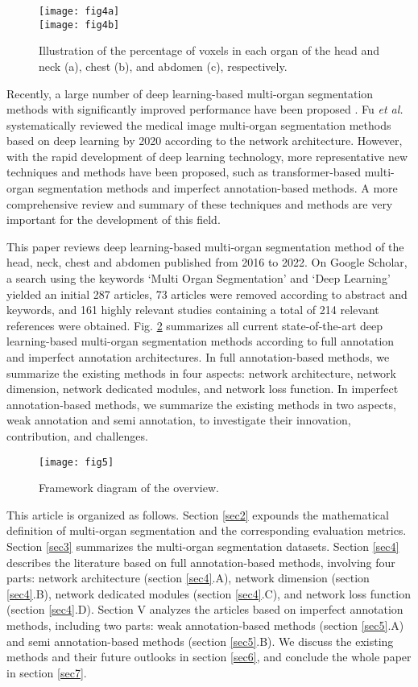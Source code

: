 \documentclass[lettersize,journal]{IEEEtran}
\begin{document}
\begin{figure}[ht!]
    \centering
    \texttt{[image: fig4a]}\\ 
    \texttt{[image: fig4b]}
    \caption{Illustration of the percentage of voxels in each organ of the head and neck (a), chest (b), and abdomen (c), respectively.}
    \label{fig4}
\end{figure}

Recently, a large number of deep learning-based multi-organ segmentation methods with significantly improved performance have been proposed \cite{27}. Fu {\it{et al.}} \cite{28} systematically reviewed the medical image multi-organ segmentation methods based on deep learning by 2020 according to the network architecture. However, with the rapid development of deep learning technology, more representative new techniques and methods have been proposed, such as transformer-based multi-organ segmentation methods and imperfect annotation-based methods. A more comprehensive review and summary of these techniques and methods are very important for the development of this field.

This paper reviews deep learning-based multi-organ segmentation method of the head, neck, chest and abdomen published from 2016 to 2022. On Google Scholar, a search using the keywords `Multi Organ Segmentation' and `Deep Learning' yielded an initial 287 articles, 73 articles were removed according to abstract and keywords, and 161 highly relevant studies containing a total of 214 relevant references were obtained. Fig. \ref{fig5} summarizes all current state-of-the-art deep learning-based multi-organ segmentation methods according to full annotation and imperfect annotation architectures. In full annotation-based methods, we summarize the existing methods in four aspects: network architecture, network dimension, network dedicated modules, and network loss function. In imperfect annotation-based methods, we summarize the existing methods in two aspects, weak annotation and semi annotation, to investigate their innovation, contribution, and challenges.
\begin{figure}[ht!]
    \centering
    \texttt{[image: fig5]}
    \caption{Framework diagram of the overview.}
    \label{fig5}
\end{figure}

This article is organized as follows. Section \ref{sec2} expounds the mathematical definition of multi-organ segmentation and the corresponding evaluation metrics. Section \ref{sec3} summarizes the multi-organ segmentation datasets. Section \ref{sec4} describes the literature based on full annotation-based methods, involving four parts: network architecture (section \ref{sec4}.A), network dimension (section \ref{sec4}.B), network dedicated modules (section \ref{sec4}.C), and network loss function (section \ref{sec4}.D). Section V analyzes the articles based on imperfect annotation methods, including two parts: weak annotation-based methods (section \ref{sec5}.A) and semi annotation-based methods (section \ref{sec5}.B). We discuss the existing methods and their future outlooks in section \ref{sec6}, and conclude the whole paper in section \ref{sec7}.
\end{document}
